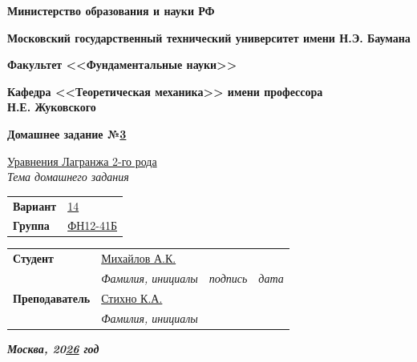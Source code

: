 \documentclass{article}
\begin{document}
\fontsize{14}{16}\selectfont

\begin{titlepage}
	\begin{flushleft}
		{\Large\textbf{Министерство образования и науки РФ}}
		
		\vspace{1cm}
		
		{\Large\textbf{Московский государственный технический университет имени Н.Э. Баумана}}
		
		\vspace{1cm}
		
		{\Large\textbf{Факультет <<Фундаментальные науки>>}}
		
		\vspace{1cm}
		
		{\Large\textbf{Кафедра <<Теоретическая механика>> имени профессора\\Н.Е. Жуковского}}
		
		\vspace{3cm}
		
		\textbf{\Large Домашнее задание №\underline{3}}
		
		\vspace{0.4cm}
		
		\underline{Уравнения Лагранжа 2-го рода}\\[-1mm]
		
		{\normalsize \textit{Тема домашнего задания}}
		
		\vspace{1cm}
		
		\begin{tabular}{@{} p{2cm} p{3cm} @{}}
			\textbf{Вариант} & \underline{14} \tabularnewline[4mm]
			\textbf{Группа} & \underline{ФН12-41Б}
		\end{tabular}
		
		\vspace{2cm}
		
		\begin{tabular}{@{} p{3.8cm} p{5.4cm} p{2.5cm} p{3cm} @{}}
			\textbf{Студент} & \underline{Михайлов А.К.} & \hrulefill & \hrulefill \\[-1mm]
			
			& {\normalsize \textit{Фамилия, инициалы}} & {\normalsize \textit{подпись}} & {\normalsize \textit{дата}} \tabularnewline[6mm]
			
			\textbf{Преподаватель} & \underline{Стихно К.А.} & & \\[-1mm]
			
			& {\normalsize \textit{Фамилия, инициалы}} & &
		\end{tabular}
		
		\vfill
		
		\textbf{\textit{Москва, 20\underline{26} год}}
	\end{flushleft}
\end{titlepage}
\end{document}
